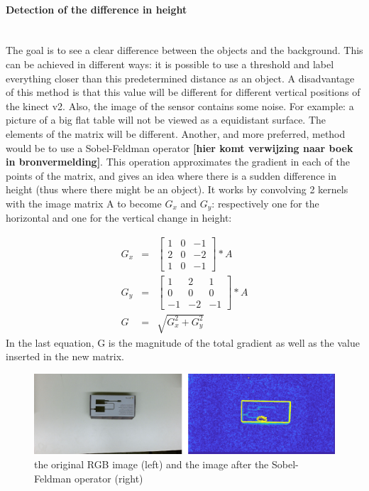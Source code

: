 \documentclass[11pt]{article}
\begin{document}
\paragraph{Detection of the difference in height}\mbox{}\\
The goal is to see a clear difference between the objects and the background. This can be achieved in different ways: it is possible to use a threshold and label everything closer than this predetermined distance as an object. A disadvantage of this method is that this value will be different for different vertical positions of the kinect v2. Also, the image of the sensor contains some noise. For example: a picture of a big flat table will not be viewed as a equidistant surface. The elements of the matrix will be different. Another, and more preferred, method would be to use a Sobel-Feldman operator \textbf{[hier komt verwijzing naar boek in bronvermelding]}. This operation approximates the gradient in each of the points of the matrix, and gives an idea where there is a sudden difference in height (thus where there might be an object). It works by convolving 2 kernels with the image matrix A to become $G_{x}$ and $G_{y}$: respectively one for the horizontal and one for the vertical change in height: 

\begin{eqnarray*}
G_{x} &=& 
	\begin{bmatrix}
		1&0&-1\\
		2&0&-2\\
		1&0&-1
	\end{bmatrix}
	*A \\
G_{y} &=& 
	\begin{bmatrix}
		1&2&1\\
		0&0&0\\
		-1&-2&-1
	\end{bmatrix}
	*A\\
G &=& \sqrt{G_{x}^2+G_{y}^2}
\end{eqnarray*}
In the last equation, G is the magnitude of the total gradient as well as the value inserted in the new matrix.

\begin{figure}[h]
	\center
  \includegraphics[width=1\linewidth]{original_and_sobel.png}
  \caption{the original RGB image (left) and the image after the Sobel-Feldman operator (right)}
  \label{fig:Moore_Neighbor}
\end{figure}
\end{document}
